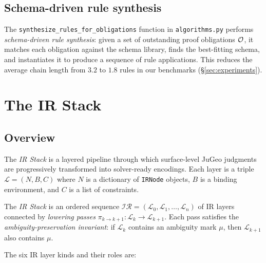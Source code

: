 \documentclass[11pt]{article}
\newcommand{\IRSt}{\mathcal{IR}}              %
\newcommand{\Lower}{\pi}                      %
\begin{document}
\subsection{Schema-driven rule synthesis}

The \lstinline|synthesize_rules_for_obligations| function in
\lstinline|algorithms.py| performs \emph{schema-driven rule synthesis}:
given a set of outstanding proof obligations $\mathcal{O}$, it matches each
obligation against the schema library, finds the best-fitting schema,
and instantiates it to produce a sequence of rule applications.  This
reduces the average chain length from $3.2$ to $1.8$ rules in our
benchmarks (§\ref{sec:experiments}).

\section{The IR Stack}\label{sec:ir}

\subsection{Overview}

The \emph{IR Stack} is a layered pipeline through which surface-level
JuGeo judgments are progressively transformed into solver-ready
encodings.  Each layer is a triple $\mathcal{L} = (N, B, C)$ where
$N$ is a dictionary of \lstinline|IRNode| objects, $B$ is a binding
environment, and $C$ is a list of constraints.

\begin{definition}[IR Stack]\label{def:ir-stack}
The \emph{IR Stack} is an ordered sequence
$\IRSt = (\mathcal{L}_0, \mathcal{L}_1, \ldots, \mathcal{L}_n)$
of IR layers connected by \emph{lowering passes}
$\Lower_{k \to k+1} : \mathcal{L}_k \to \mathcal{L}_{k+1}$.
Each pass satisfies the \emph{ambiguity-preservation invariant}:
if $\mathcal{L}_k$ contains an ambiguity mark $\mu$,
then $\mathcal{L}_{k+1}$ also contains $\mu$.
\end{definition}

The six IR layer kinds and their roles are:
\end{document}
